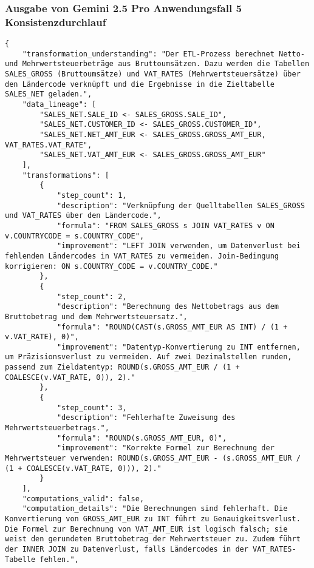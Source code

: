 \subsubsection{Ausgabe von Gemini 2.5 Pro Anwendungsfall 5 Konsistenzdurchlauf}\label{anhang:subsubsec:gemini_case5_prompt2}
\begin{lstlisting}[caption={Ausgabe: Gemini 2.5 Pro Anwendungsfall 5 Konsistenzdurchlauf},label={gemini_case5_prompt2}]
{
    "transformation_understanding": "Der ETL-Prozess berechnet Netto- und Mehrwertsteuerbeträge aus Bruttoumsätzen. Dazu werden die Tabellen SALES_GROSS (Bruttoumsätze) und VAT_RATES (Mehrwertsteuersätze) über den Ländercode verknüpft und die Ergebnisse in die Zieltabelle SALES_NET geladen.",
    "data_lineage": [
        "SALES_NET.SALE_ID <- SALES_GROSS.SALE_ID",
        "SALES_NET.CUSTOMER_ID <- SALES_GROSS.CUSTOMER_ID",
        "SALES_NET.NET_AMT_EUR <- SALES_GROSS.GROSS_AMT_EUR, VAT_RATES.VAT_RATE",
        "SALES_NET.VAT_AMT_EUR <- SALES_GROSS.GROSS_AMT_EUR"
    ],
    "transformations": [
        {
            "step_count": 1,
            "description": "Verknüpfung der Quelltabellen SALES_GROSS und VAT_RATES über den Ländercode.",
            "formula": "FROM SALES_GROSS s JOIN VAT_RATES v ON v.COUNTRYCODE = s.COUNTRY_CODE",
            "improvement": "LEFT JOIN verwenden, um Datenverlust bei fehlenden Ländercodes in VAT_RATES zu vermeiden. Join-Bedingung korrigieren: ON s.COUNTRY_CODE = v.COUNTRY_CODE."
        },
        {
            "step_count": 2,
            "description": "Berechnung des Nettobetrags aus dem Bruttobetrag und dem Mehrwertsteuersatz.",
            "formula": "ROUND(CAST(s.GROSS_AMT_EUR AS INT) / (1 + v.VAT_RATE), 0)",
            "improvement": "Datentyp-Konvertierung zu INT entfernen, um Präzisionsverlust zu vermeiden. Auf zwei Dezimalstellen runden, passend zum Zieldatentyp: ROUND(s.GROSS_AMT_EUR / (1 + COALESCE(v.VAT_RATE, 0)), 2)."
        },
        {
            "step_count": 3,
            "description": "Fehlerhafte Zuweisung des Mehrwertsteuerbetrags.",
            "formula": "ROUND(s.GROSS_AMT_EUR, 0)",
            "improvement": "Korrekte Formel zur Berechnung der Mehrwertsteuer verwenden: ROUND(s.GROSS_AMT_EUR - (s.GROSS_AMT_EUR / (1 + COALESCE(v.VAT_RATE, 0))), 2)."
        }
    ],
    "computations_valid": false,
    "computation_details": "Die Berechnungen sind fehlerhaft. Die Konvertierung von GROSS_AMT_EUR zu INT führt zu Genauigkeitsverlust. Die Formel zur Berechnung von VAT_AMT_EUR ist logisch falsch; sie weist den gerundeten Bruttobetrag der Mehrwertsteuer zu. Zudem führt der INNER JOIN zu Datenverlust, falls Ländercodes in der VAT_RATES-Tabelle fehlen.",

\end{lstlisting}
